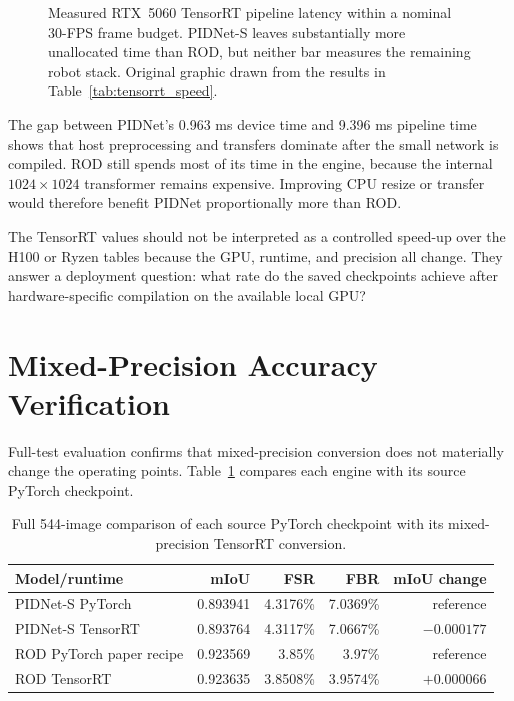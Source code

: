 \begin{figure}[H]
\centering
\resizebox{0.92\textwidth}{!}{}
\caption[TensorRT latency within a 30-FPS frame budget.]{Measured RTX~5060
TensorRT pipeline latency within a nominal 30-FPS frame budget. PIDNet-S leaves
substantially more unallocated time than ROD, but neither bar measures the
remaining robot stack. Original graphic drawn from the results in
Table~\ref{tab:tensorrt_speed}.}
\label{fig:tensorrt_frame_budget}
\end{figure}

The gap between PIDNet's 0.963 ms device time and 9.396 ms pipeline time shows
that host preprocessing and transfers dominate after the small network is
compiled. ROD still spends most of its time in the engine, because the internal
$1024\times1024$ transformer remains expensive. Improving CPU resize or transfer would
therefore benefit PIDNet proportionally more than ROD.

The TensorRT values should not be interpreted as a controlled speed-up over
the H100 or Ryzen tables because the GPU, runtime, and precision all change.
They answer a deployment question: what rate do the saved checkpoints achieve
after hardware-specific compilation on the available local GPU?

\section{Mixed-Precision Accuracy Verification}

Full-test evaluation confirms that mixed-precision conversion does not materially change
the operating points. Table~\ref{tab:tensorrt_accuracy} compares each engine
with its source PyTorch checkpoint.

\begin{table}[H]
\centering
\caption{Full 544-image comparison of each source PyTorch checkpoint with its
mixed-precision TensorRT conversion.}
\label{tab:tensorrt_accuracy}
\small
\begin{tabular}{@{}lrrrr@{}}
\toprule
\textbf{Model/runtime} & \textbf{mIoU} & \textbf{FSR} & \textbf{FBR} & \textbf{mIoU change} \\
\midrule
PIDNet-S PyTorch & 0.893941 & 4.3176\% & 7.0369\% & reference \\
PIDNet-S TensorRT & 0.893764 & 4.3117\% & 7.0667\% & $-0.000177$ \\
\midrule
ROD PyTorch paper recipe & 0.923569 & 3.85\% & 3.97\% & reference \\
ROD TensorRT & 0.923635 & 3.8508\% & 3.9574\% & $+0.000066$ \\
\bottomrule
\end{tabular}
\end{table}

